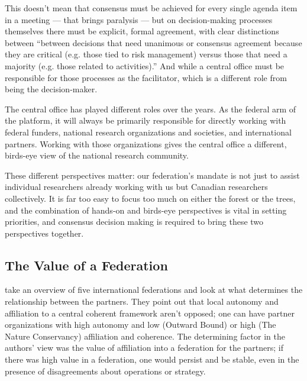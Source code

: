 \documentclass[11pt, letterpaper, twoside]{article}
\begin{document}
This doesn't mean that consensus must be achieved for every single
agenda item in a meeting --- that brings paralysis --- but on
decision-making processes themselves there must be explicit, formal
agreement, with clear distinctions between ``between decisions that need
unanimous or consensus agreement because they are critical (e.g. those
tied to risk management) versus those that need a majority (e.g. those
related to activities).'' And while a central office must be responsible
for those processes as the facilitator, which is a different role from
being the decision-maker.

The central office has played different roles over the years. As the
federal arm of the platform, it will always be primarily responsible for
directly working with federal funders, national research organizations
and societies, and international partners.  Working with those
organizations gives the central office a different, birds-eye view of
the national research community.

These different perspectives matter: our federation's mandate is not
just to assist individual researchers already working with us but
Canadian researchers collectively. It is far too easy to focus too much
on either the forest or the trees, and the combination of hands-on and
birds-eye perspectives is vital in setting priorities, and consensus
decision making is required to bring these two perspectives together.

\subsection*{The Value of a Federation}
%

\cite{grossman2001managing} take an overview of five international
federations and look at what determines the relationship between the
partners. They point out that local autonomy and affiliation to a
central coherent framework aren't opposed; one can have partner
organizations with high autonomy and low (Outward Bound) or high (The
Nature Conservancy) affiliation and coherence. The determining factor in
the authors' view was the value of affiliation into a federation for the
partners; if there was high value in a federation, one would persist and
be stable, even in the presence of disagreements about operations or
strategy.

\end{document}
